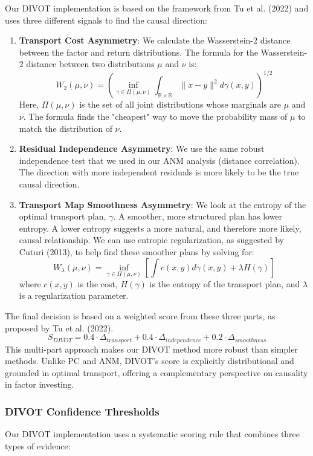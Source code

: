 Our DIVOT implementation is based on the framework from Tu et al. (2022) and uses three different signals to find the causal direction\cite{Tu22}:
\begin{enumerate}
    \item \textbf{Transport Cost Asymmetry}: We calculate the Wasserstein-2 distance between the factor and return distributions. The formula for the Wasserstein-2 distance between two distributions $\mu$ and $\nu$ is:
    $$W_2(\mu, \nu) = \left( \inf_{\gamma \in \Pi(\mu,\nu)} \int_{\mathbb{R} \times \mathbb{R}} \|x - y\|^2 d\gamma(x,y) \right)^{1/2}$$
    Here, $\Pi(\mu,\nu)$ is the set of all joint distributions whose marginals are $\mu$ and $\nu$. The formula finds the "cheapest" way to move the probability mass of $\mu$ to match the distribution of $\nu$.

    \item \textbf{Residual Independence Asymmetry}: We use the same robust independence test that we used in our ANM analysis (distance correlation). The direction with more independent residuals is more likely to be the true causal direction.

    \item \textbf{Transport Map Smoothness Asymmetry}: We look at the entropy of the optimal transport plan, $\gamma$. A smoother, more structured plan has lower entropy. A lower entropy suggests a more natural, and therefore more likely, causal relationship. We can use entropic regularization, as suggested by Cuturi (2013), to help find these smoother plans by solving for:
    $$W_{\lambda}(\mu, \nu) = \inf_{\gamma \in \Pi(\mu,\nu)} \left[\int c(x,y) d\gamma(x,y) + \lambda H(\gamma)\right]$$
    where $c(x,y)$ is the cost, $H(\gamma)$ is the entropy of the transport plan, and $\lambda$ is a regularization parameter\cite{Cuturi13}.
\end{enumerate}

The final decision is based on a weighted score from these three parts, as proposed by Tu et al. (2022).
$$S_{DIVOT} = 0.4 \cdot \Delta_{transport} + 0.4 \cdot \Delta_{independence} + 0.2 \cdot \Delta_{smoothness}$$
This multi-part approach makes our DIVOT method more robust than simpler methods. Unlike PC and ANM, DIVOT's score is explicitly distributional and grounded in optimal transport, offering a complementary perspective on causality in factor investing.

\subsubsection{DIVOT Confidence Thresholds}
Our DIVOT implementation uses a systematic scoring rule that combines three types of evidence:


